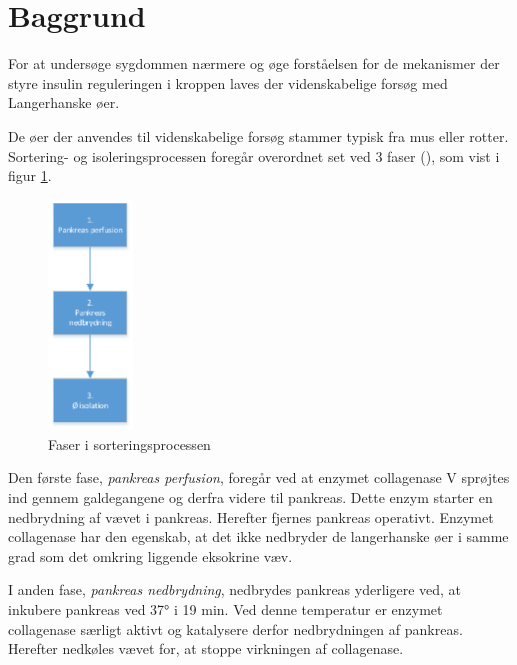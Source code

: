 \section{Baggrund}
For at undersøge sygdommen nærmere og øge forståelsen for de mekanismer der styre insulin reguleringen i kroppen laves der videnskabelige forsøg med Langerhanske øer.

De øer der anvendes til videnskabelige forsøg stammer typisk fra mus eller rotter. Sortering- og isoleringsprocessen foregår overordnet set ved 3 faser (\cite{per}), som vist i figur \ref{fig:sortproces}. 

\begin{figure}[H]
	\centering
	\includegraphics[width=0.2\textwidth]{billeder/sortering-crop.pdf}
	\caption{Faser i sorteringsprocessen}
	\label{fig:sortproces}
\end{figure}

Den første fase, \textit{pankreas perfusion}, foregår ved at  enzymet collagenase V sprøjtes ind gennem galdegangene og derfra videre til  pankreas. Dette enzym starter en nedbrydning af vævet i pankreas. Herefter fjernes pankreas operativt. Enzymet collagenase har den egenskab, at det ikke nedbryder de langerhanske øer i samme grad som det omkring liggende eksokrine væv.

I anden fase, \textit{pankreas nedbrydning}, nedbrydes pankreas yderligere ved, at inkubere pankreas ved 37° i 19 min. Ved denne temperatur er enzymet collagenase særligt aktivt og katalysere derfor nedbrydningen af pankreas. Herefter nedkøles vævet for, at stoppe virkningen af collagenase.


